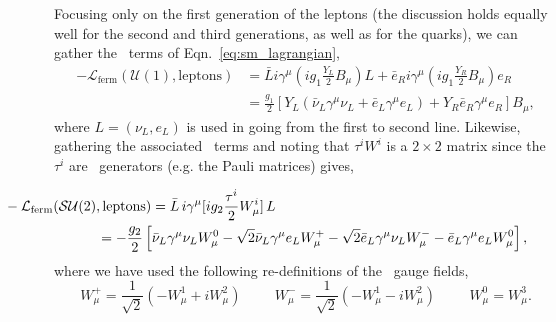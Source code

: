 Focusing only on the first generation of the leptons (the discussion holds equally well
for the second and third generations, as well as for the quarks), we can gather the
\Uone~terms of Eqn.~\ref{eq:sm_lagrangian},
\begin{align}
    -\mathcal{L}_{\text{ferm}}(\mathcal{U}(1), \text{leptons}) &= \bar{L} i \gamma^{\mu} (i g_1 \frac{Y_L}{2} B_{\mu})L + \bar{e}_R i \gamma^{\mu} (i g_1 \frac{Y_R}{2} B_{\mu}) e_R \nonumber \\
    &= \frac{g_1}{2} [ Y_L ( \bar{\nu}_L \gamma^{\mu} \nu_L + \bar{e}_L \gamma^{\mu} e_L) + Y_R \bar{e}_R \gamma^{\mu} e_R ] B_{\mu},
    \label{eq:ferm_L_u1}
\end{align}
where $L = (\nu_L, e_L)$ is used in going from the first to second line. 
Likewise, gathering the associated \SUtwo~terms and noting that $\tau^i W^i$ is a
$2\times2$ matrix since the $\tau^i$ are \SUtwo~generators (e.g. the Pauli matrices) gives,

\begin{equation}
	\begin{multlined}
		\hspace{-2cm}-\mathcal{L}_{\text{ferm}}(\mathcal{SU}(2), \text{leptons}) =  \bar{L}\, i \gamma^{\mu} [i g_2 \frac{\tau^i}{2} W_{\mu}^i ] \,L \\
		= -\frac{g_2}{2} \left[ \bar{\nu}_L \gamma^{\mu} \nu_L W_{\mu}^0 - \sqrt{2}  \bar{\nu}_L \gamma^{\mu} e_L W_{\mu}^+ - \sqrt{2} \bar{e}_L \gamma^{\mu} \nu_L W_{\mu}^- - \bar{e}_L \gamma^{\mu} e_L W_{\mu}^0 \right],
	\end{multlined}
	\label{eq:ferm_L_su2}
\end{equation}
where we have used the following re-definitions of the \SUtwo~gauge fields,
\begin{equation}
	W_{\mu}^+ = \frac{1}{\sqrt{2}} \left( -W_{\mu}^1 + i W_{\mu}^2 \right) \hspace{1cm} W_{\mu}^- = \frac{1}{\sqrt{2}} \left( -W_{\mu}^1 - i W_{\mu}^2 \right) \hspace{1cm} W_{\mu}^0 = W_{\mu}^3.
\end{equation}


